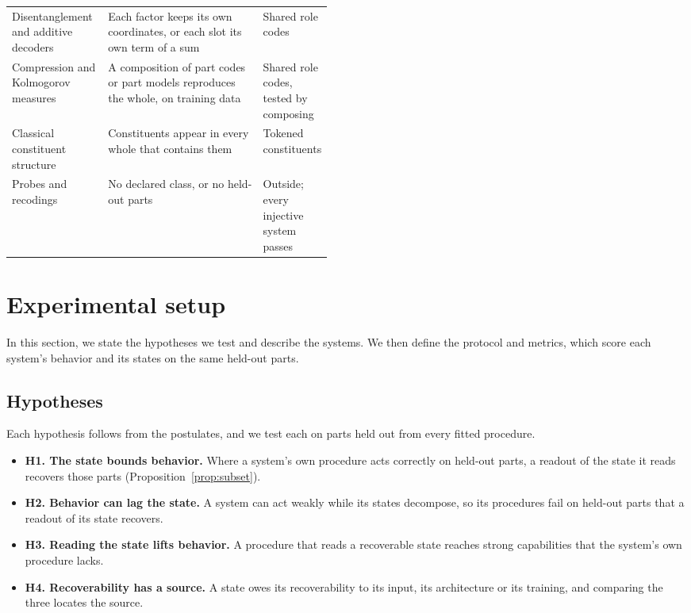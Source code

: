 \begin{table}[t]
\begin{tabularx}{\linewidth}{@{}P{0.30\linewidth}YP{0.17\linewidth}@{}}
    Disentanglement and additive decoders \citep{bengio2013,lachapelle2023,wiedemer2024} & Each factor keeps its own coordinates, or each slot its own term of a sum & Shared role codes \\
    Compression and Kolmogorov measures \citep{andreas2019,elmoznino2024,elmoznino2026} & A composition of part codes or part models reproduces the whole, on training data & Shared role codes, tested by composing \\
    \addlinespace
    Classical constituent structure \citep{fodor1988} & Constituents appear in every whole that contains them & Tokened constituents \\
    \addlinespace
    Probes \citep{belinkov2022,hewitt2019} and recodings \citep{zadrozny1994} & No declared class, or no held-out parts & Outside; every injective system passes \\
    \bottomrule
  \end{tabularx}
\end{table}

\section{Experimental setup}
\label{sec:experiments}

In this section, we state the hypotheses we test and describe the systems. We then define the protocol and metrics, which score each system's behavior and its states on the same held-out parts.

\subsection{Hypotheses}

Each hypothesis follows from the postulates, and we test each on parts held out from every fitted procedure.
\begin{itemize}
  \item \textbf{H1. The state bounds behavior.} Where a system's own procedure acts correctly on held-out parts, a readout of the state it reads recovers those parts (Proposition~\ref{prop:subset}).
  \item \textbf{H2. Behavior can lag the state.} A system can act weakly while its states decompose, so its procedures fail on held-out parts that a readout of its state recovers.
  \item \textbf{H3. Reading the state lifts behavior.} A procedure that reads a recoverable state reaches strong capabilities that the system's own procedure lacks.
  \item \textbf{H4. Recoverability has a source.} A state owes its recoverability to its input, its architecture or its training, and comparing the three locates the source.
\end{itemize}

